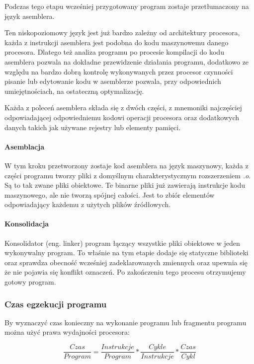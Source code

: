 Podczas tego etapu wcześniej przygotowany program zostaje przetłumaczony na język asemblera. 

Ten niskopoziomowy język jest już bardzo zależny od architektury procesora, każda z  instrukcji asemblera jest podobna do kodu maszynowemu danego procesora. 
Dlatego też analiza programu po procesie kompilacji do kodu asemblera pozwala na dokładne przewidzenie działania programu, dodatkowo
ze względu na bardzo dobrą kontrolę wykonywanych przez procesor czynności pisanie lub edytowanie kodu w asemblerze pozwala, przy odpowiednich umiejętnościach, na ostateczną optymalizację. 

Każda z poleceń asemblera składa się z dwóch części, z mnemoniki najczęściej odpowiadającej odpowiedniemu kodowi operacji procesora oraz dodatkowych danych takich jak używane rejestry lub elementy pamięci. 

\paragraph{Asemblacja}

W tym kroku przetworzony zostaje kod asemblera na język maszynowy, każda z części programu tworzy pliki z domyślnym charakterystycznym rozszerzeniem \textit{.o}.
Są to tak zwane pliki obiektowe.
Te binarne pliki już zawierają instrukcje kodu maszynowego, ale nie tworzą spójnej całości. Jest to zbiór elementów odpowiadający każdemu z użytych plików źródłowych.

\paragraph{Konsolidacja}
Konsolidator (eng. linker) program łączący wszystkie pliki obiektowe w jeden wykonywalny program. To właśnie na tym etapie dodaje się statyczne biblioteki oraz sprawdza obecność wcześniej zadeklarowanych zmiennych oraz upewnia się że nie pojawia się konflikt oznaczeń. Po zakończeniu tego procesu otrzymujemy gotowy program. 


\subsubsection{Czas egzekucji programu}

By wyznaczyć czas konieczny na wykonanie programu lub fragmentu programu można użyć prawa wydajności procesora\cite{arch}:

\begin{equation}
        \label{Iron Law}
        \frac{Czas}{Program} =  \frac{Instrukcje}{Program} * \frac{Cykle}{Instrukcje} * \frac{Czas}{Cykl}
\end{equation}

